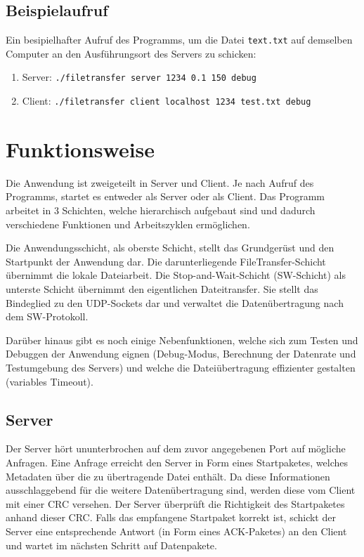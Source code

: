 \documentclass{article}
\begin{document}
		\subsection{Beispielaufruf}
		Ein besipielhafter Aufruf des Programms, um die Datei \texttt{text.txt} auf demselben Computer an den Ausführungsort des Servers zu schicken:

		\begin{enumerate}
			\item Server: \texttt{./filetransfer server 1234 0.1 150 debug}
			\item Client: \texttt{./filetransfer client localhost 1234 test.txt debug}
		\end{enumerate}

	\section{Funktionsweise}
	Die Anwendung ist zweigeteilt in Server und Client. Je nach Aufruf des Programms, startet es entweder als Server oder als Client. Das Programm arbeitet in 3 Schichten, welche hierarchisch aufgebaut sind und dadurch verschiedene Funktionen und Arbeitszyklen ermöglichen.

	Die Anwendungsschicht, als oberste Schicht, stellt das Grundgerüst und den Startpunkt der Anwendung dar. Die darunterliegende FileTransfer-Schicht übernimmt die lokale Dateiarbeit. Die Stop-and-Wait-Schicht (SW-Schicht) als unterste Schicht übernimmt den eigentlichen Dateitransfer. Sie stellt das Bindeglied zu den UDP-Sockets dar und verwaltet die Datenübertragung nach dem SW-Protokoll.


	Darüber hinaus gibt es noch einige Nebenfunktionen, welche sich zum Testen und Debuggen der Anwendung eignen (Debug-Modus, Berechnung der Datenrate und Testumgebung des Servers) und welche die Dateiübertragung effizienter gestalten (variables Timeout). 

		\subsection{Server}
		Der Server hört ununterbrochen auf dem zuvor angegebenen Port auf mögliche Anfragen. Eine Anfrage erreicht den Server in Form eines Startpaketes, welches Metadaten über die zu übertragende Datei enthält. Da diese Informationen ausschlaggebend für die weitere Datenübertragung sind, werden diese vom Client mit einer CRC versehen. Der Server überprüft die Richtigkeit des Startpaketes anhand dieser CRC. Falls das empfangene Startpaket korrekt ist, schickt der Server eine entsprechende Antwort (in Form eines ACK-Paketes) an den Client und wartet im nächsten Schritt auf Datenpakete.
\end{document}

